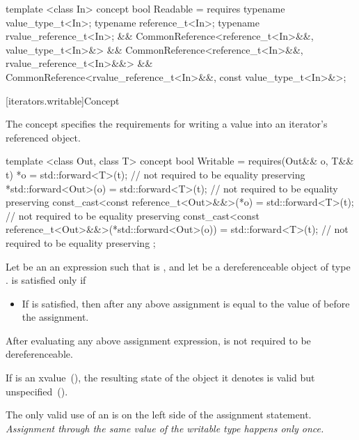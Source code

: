%
\begin{codeblock}
  template <class In>
  concept bool Readable =
    requires {
      typename value_type_t<In>;
      typename reference_t<In>;
      typename rvalue_reference_t<In>;
    } &&
    CommonReference<reference_t<In>&&, value_type_t<In>&> &&
    CommonReference<reference_t<In>&&, rvalue_reference_t<In>&&> &&
    CommonReference<rvalue_reference_t<In>&&, const value_type_t<In>&>;
\end{codeblock}

[iterators.writable]{Concept }

\pnum
The  concept specifies the requirements for writing a value into an iterator's
referenced object.

%
\begin{codeblock}
  template <class Out, class T>
  concept bool Writable =
    requires(Out&& o, T&& t) {
      *o = std::forward<T>(t); // not required to be equality preserving
      *std::forward<Out>(o) = std::forward<T>(t); // not required to be equality preserving
      const_cast<const reference_t<Out>&&>(*o) =
        std::forward<T>(t); // not required to be equality preserving
      const_cast<const reference_t<Out>&&>(*std::forward<Out>(o)) =
        std::forward<T>(t); // not required to be equality preserving
    };
\end{codeblock}

\pnum
Let  be an an expression such that  is , and let 
be a dereferenceable object of type .  is satisfied only if

\begin{itemize}
\item If  is satisfied,
then  after any above assignment is equal
to the value of  before the assignment.
\end{itemize}

\pnum
After evaluating any above assignment expression,  is not required to be dereferenceable.

\pnum
If  is an xvalue~(), the resulting
state of the object it denotes is valid but unspecified~().

\pnum
\enternote
The only valid use of an  is on the left side of the assignment statement.
\textit{Assignment through the same value of the writable type happens only once.}
\exitnote

